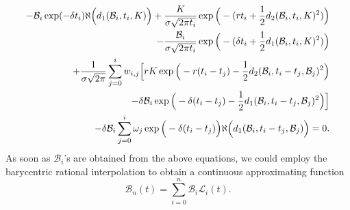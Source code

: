 \documentclass[fleqn,final,3p,11pt]{elsarticle}
\theoremstyle{definition}
\theoremstyle{remark}
\numberwithin{equation}{section}
\begin{document}
\begin{eqnarray}\label{diskimdiv}
-\mathcal{B}_{i}\exp(-\delta t_{i}) \aleph \Big(d_{1}(\mathcal{B}_{i},t_{i}, K)\Big) +\frac{K}{\sigma \sqrt{2\pi t_{i}}} \exp \Big(- (rt_{i} + \frac{1}{2}d_{2}(\mathcal{B}_{i}, t_{i}, K)^{2})  \Big)\\\notag
 -\frac{\mathcal{B}_{i}}{\sigma \sqrt{2\pi t_{i}}} \exp \Big(- (\delta t_{i} + \frac{1}{2}d_{1}(\mathcal{B}_{i}, t_{i}, K)^{2})  \Big)\\\notag
+
\frac{1}{\sigma \sqrt{2\pi}}\sum_{j=0}^{i} w_{i,j}\Big[ rK \exp \Big(- r(t_{i}-t_{j}) - \frac{1}{2} d_{2}(\mathcal{B}_{i}, t_{i}-t_{j}, \mathcal{B}_{j})^{2}\Big)\\\notag
-\delta \mathcal{B}_{i} \exp \Big(- \delta(t_{i} - t_{j}) - \frac{1}{2} d_{1}(\mathcal{B}_{i}, t_{i}-t_{j}, \mathcal{B}_{j})^{2}\Big)\Big]\\\notag
- \delta \mathcal{B}_{i} \sum_{j=0}^{i}\omega_{j}\exp \Big(-\delta (t_{i} - t_{j})\Big)  \aleph \Big(d_{1} (\mathcal{B}_{i}, t_{i}- t_{j},  \mathcal{B}_{j})\Big) = 0.
\end{eqnarray}
As soon as $\mathcal{B}_{i}$'s are obtained from the above equations, we could employ the barycentric rational interpolation to obtain a continuous approximating function
\begin{equation}\label{ghe}
\mathcal{B}_{n}(t) = \sum_{i=0}^{n}\mathcal{B}_{i}\mathcal{L}_{i}(t).\end{equation}
\end{document}
